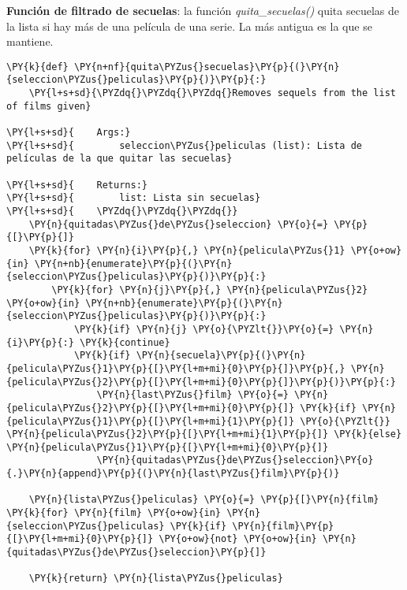     \textbf{Función de filtrado de secuelas}: la función
\emph{quita\_secuelas()} quita secuelas de la lista si hay más de una
película de una serie. La más antigua es la que se mantiene.

    \begin{tcolorbox}[breakable, size=fbox, boxrule=1pt, pad at break*=1mm,colback=cellbackground, colframe=cellborder]
\begin{Verbatim}[commandchars=\\\{\}]
\PY{k}{def} \PY{n+nf}{quita\PYZus{}secuelas}\PY{p}{(}\PY{n}{seleccion\PYZus{}peliculas}\PY{p}{)}\PY{p}{:}
    \PY{l+s+sd}{\PYZdq{}\PYZdq{}\PYZdq{}Removes sequels from the list of films given}

\PY{l+s+sd}{    Args:}
\PY{l+s+sd}{        seleccion\PYZus{}peliculas (list): Lista de películas de la que quitar las secuelas}

\PY{l+s+sd}{    Returns:}
\PY{l+s+sd}{        list: Lista sin secuelas}
\PY{l+s+sd}{    \PYZdq{}\PYZdq{}\PYZdq{}} 
    \PY{n}{quitadas\PYZus{}de\PYZus{}seleccion} \PY{o}{=} \PY{p}{[}\PY{p}{]}
    \PY{k}{for} \PY{n}{i}\PY{p}{,} \PY{n}{pelicula\PYZus{}1} \PY{o+ow}{in} \PY{n+nb}{enumerate}\PY{p}{(}\PY{n}{seleccion\PYZus{}peliculas}\PY{p}{)}\PY{p}{:}
        \PY{k}{for} \PY{n}{j}\PY{p}{,} \PY{n}{pelicula\PYZus{}2} \PY{o+ow}{in} \PY{n+nb}{enumerate}\PY{p}{(}\PY{n}{seleccion\PYZus{}peliculas}\PY{p}{)}\PY{p}{:}
            \PY{k}{if} \PY{n}{j} \PY{o}{\PYZlt{}}\PY{o}{=} \PY{n}{i}\PY{p}{:} \PY{k}{continue} 
            \PY{k}{if} \PY{n}{secuela}\PY{p}{(}\PY{n}{pelicula\PYZus{}1}\PY{p}{[}\PY{l+m+mi}{0}\PY{p}{]}\PY{p}{,} \PY{n}{pelicula\PYZus{}2}\PY{p}{[}\PY{l+m+mi}{0}\PY{p}{]}\PY{p}{)}\PY{p}{:} 
                \PY{n}{last\PYZus{}film} \PY{o}{=} \PY{n}{pelicula\PYZus{}2}\PY{p}{[}\PY{l+m+mi}{0}\PY{p}{]} \PY{k}{if} \PY{n}{pelicula\PYZus{}1}\PY{p}{[}\PY{l+m+mi}{1}\PY{p}{]} \PY{o}{\PYZlt{}} \PY{n}{pelicula\PYZus{}2}\PY{p}{[}\PY{l+m+mi}{1}\PY{p}{]} \PY{k}{else} \PY{n}{pelicula\PYZus{}1}\PY{p}{[}\PY{l+m+mi}{0}\PY{p}{]}
                \PY{n}{quitadas\PYZus{}de\PYZus{}seleccion}\PY{o}{.}\PY{n}{append}\PY{p}{(}\PY{n}{last\PYZus{}film}\PY{p}{)}

    \PY{n}{lista\PYZus{}peliculas} \PY{o}{=} \PY{p}{[}\PY{n}{film} \PY{k}{for} \PY{n}{film} \PY{o+ow}{in} \PY{n}{seleccion\PYZus{}peliculas} \PY{k}{if} \PY{n}{film}\PY{p}{[}\PY{l+m+mi}{0}\PY{p}{]} \PY{o+ow}{not} \PY{o+ow}{in} \PY{n}{quitadas\PYZus{}de\PYZus{}seleccion}\PY{p}{]}

    \PY{k}{return} \PY{n}{lista\PYZus{}peliculas}   
\end{Verbatim}
\end{tcolorbox}

